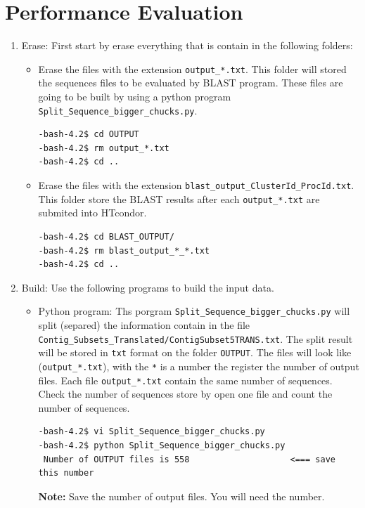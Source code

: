 \documentclass{article}
\begin{document}
\section{Performance Evaluation}
\begin{enumerate}
\item  Erase: First start by erase everything that is contain in the following folders:
\begin{itemize}
 \item Erase the files with the extension \verb+output_*.txt+. This folder will stored the sequences files to be evaluated by BLAST program. These files are going to be built by using a python program \verb+Split_Sequence_bigger_chucks.py+. 
      \scriptsize
      \begin{verbatim}
-bash-4.2$ cd OUTPUT
-bash-4.2$ rm output_*.txt
-bash-4.2$ cd ..
      \end{verbatim}
      \normalsize
\item Erase the files with the extension \verb+blast_output_ClusterId_ProcId.txt+. This folder store the BLAST results after each \verb+output_*.txt+  are submited into HTcondor. 
      \scriptsize
      \begin{verbatim}
-bash-4.2$ cd BLAST_OUTPUT/
-bash-4.2$ rm blast_output_*_*.txt
-bash-4.2$ cd ..
      \end{verbatim}
      \normalsize
\end{itemize}
\item Build: Use the following programs to build the input data. 
\begin{itemize}
\item Python program: Ths porgram \verb+Split_Sequence_bigger_chucks.py+ will split (separed) the information contain in the file \verb+Contig_Subsets_Translated/ContigSubset5TRANS.txt+. 
The split result will be stored in \verb+txt+ format on the folder \verb+OUTPUT+. The files will look like (\verb+output_*.txt+), with the \verb+*+ is a number the register the number of output files. Each file \verb+output_*.txt+ contain the same number of sequences. Check the number of sequences store by open one file and count the number of sequences.
    \scriptsize
    \begin{verbatim}
-bash-4.2$ vi Split_Sequence_bigger_chucks.py
-bash-4.2$ python Split_Sequence_bigger_chucks.py
 Number of OUTPUT files is 558                    <=== save this number
    \end{verbatim}
    \normalsize
    \textbf{Note:} Save the number of output files. You will need the number. 

\end{itemize}
\end{enumerate}
\end{document}

